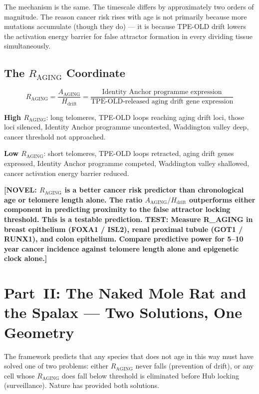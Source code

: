 \documentclass[12pt,a4paper]{article}
\newcommand{\raging}{$R_{\mathrm{AGING}}$}
\newcommand{\tpeold}{TPE-OLD}
\newcommand{\novel}[1]{\textbf{[NOVEL: #1]}}
\begin{document}
The mechanism is the same. The timescale differs by approximately two orders
of magnitude. The reason cancer risk rises with age is not primarily because
more mutations accumulate (though they do) --- it is because \tpeold{} drift
lowers the activation energy barrier for false attractor formation in every
dividing tissue simultaneously.

\subsection{The $R_{\mathrm{AGING}}$ Coordinate}

\begin{equation}
  R_{\mathrm{AGING}} = \frac{A_{\mathrm{AGING}}}{H_{\mathrm{drift}}}
  = \frac{\text{Identity Anchor programme expression}}
         {\text{\tpeold{}-released aging drift gene expression}}
\end{equation}

\textbf{High \raging{}}: long telomeres, \tpeold{} loops reaching aging drift
loci, those loci silenced, Identity Anchor programme uncontested, Waddington
valley deep, cancer threshold not approached.

\textbf{Low \raging{}}: short telomeres, \tpeold{} loops retracted, aging
drift genes expressed, Identity Anchor programme competed, Waddington valley
shallowed, cancer activation energy barrier reduced.

\novel{$R_{\mathrm{AGING}}$ is a better cancer risk predictor than
chronological age or telomere length alone. The ratio
$A_{\mathrm{AGING}} / H_{\mathrm{drift}}$ outperforms either component in
predicting proximity to the false attractor locking threshold. This is a
testable prediction. TEST: Measure R\_AGING in breast epithelium (FOXA1 /
ISL2), renal proximal tubule (GOT1 / RUNX1), and colon epithelium. Compare
predictive power for 5--10 year cancer incidence against telomere length alone
and epigenetic clock alone.}

\section{Part~II: The Naked Mole Rat and the Spalax --- Two Solutions,
One Geometry}

The framework predicts that any species that does not age in this way must
have solved one of two problems: either \raging{} never falls (prevention of
drift), or any cell whose \raging{} does fall below threshold is eliminated
before Hub locking (surveillance). Nature has provided both solutions.
\end{document}
